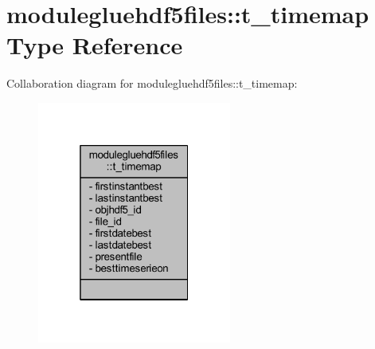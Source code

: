 \hypertarget{structmodulegluehdf5files_1_1t__timemap}{}\section{modulegluehdf5files\+:\+:t\+\_\+timemap Type Reference}
\label{structmodulegluehdf5files_1_1t__timemap}


Collaboration diagram for modulegluehdf5files\+:\+:t\+\_\+timemap\+:\nopagebreak
\begin{figure}[H]
\begin{center}
\leavevmode
\includegraphics[width=181pt]{structmodulegluehdf5files_1_1t__timemap__coll__graph}
\end{center}
\end{figure}
